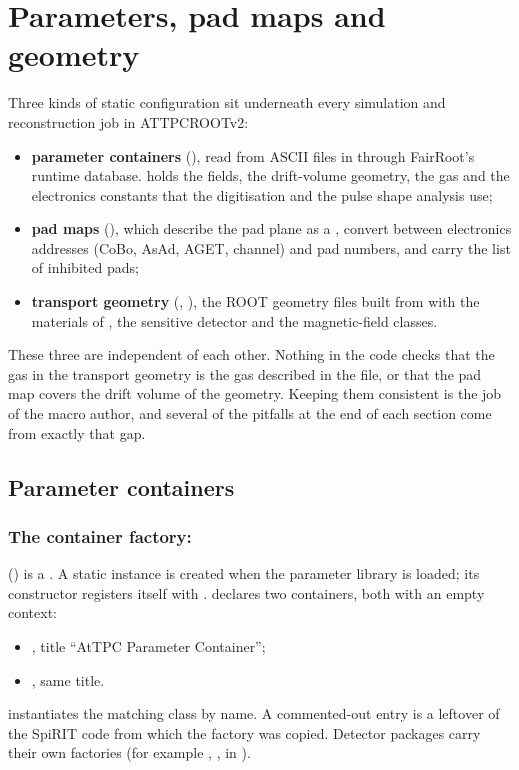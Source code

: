\chapter{Parameters, pad maps and geometry}
\label{ch:parameters}

Three kinds of static configuration sit underneath every simulation and reconstruction job in
ATTPCROOTv2:
\begin{itemize}
  \item \textbf{parameter containers} (), read from ASCII  files in
     through FairRoot's runtime database.  holds the fields, the
    drift-volume geometry, the gas and the electronics constants that the digitisation and the pulse
    shape analysis use;
  \item \textbf{pad maps} (), which describe the pad plane as a , convert
    between electronics addresses (CoBo, AsAd, AGET, channel) and pad numbers, and carry the list of
    inhibited pads;
  \item \textbf{transport geometry} (, ), the ROOT geometry files
    built from  with the materials of , the 
    sensitive detector and the magnetic-field classes.
\end{itemize}
These three are independent of each other. Nothing in the code checks that the gas in the transport
geometry is the gas described in the  file, or that the pad map covers the drift volume of
the geometry. Keeping them consistent is the job of the macro author, and several of the pitfalls at
the end of each section come from exactly that gap.

\section{Parameter containers}
\label{sec:par-containers}

\subsection{The container factory: }

 () is a . A static instance is
created when the parameter library is loaded; its constructor registers itself with
.  declares two containers, both with an empty
context:
\begin{itemize}
  \item {}, title ``AtTPC Parameter Container'';
  \item {}, same title.
\end{itemize}
 instantiates the matching class by name. A commented-out 
entry is a leftover of the SpiRIT code from which the factory was copied. Detector packages carry their
own factories (for example , , 
in ).

